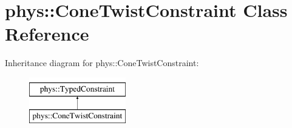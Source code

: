 \hypertarget{classphys_1_1ConeTwistConstraint}{
\section{phys::ConeTwistConstraint Class Reference}
\label{da/dbc/classphys_1_1ConeTwistConstraint}
}
Inheritance diagram for phys::ConeTwistConstraint:\begin{figure}[H]
\begin{center}
\leavevmode
\includegraphics[height=2cm]{da/dbc/classphys_1_1ConeTwistConstraint}
\end{center}
\end{figure}
